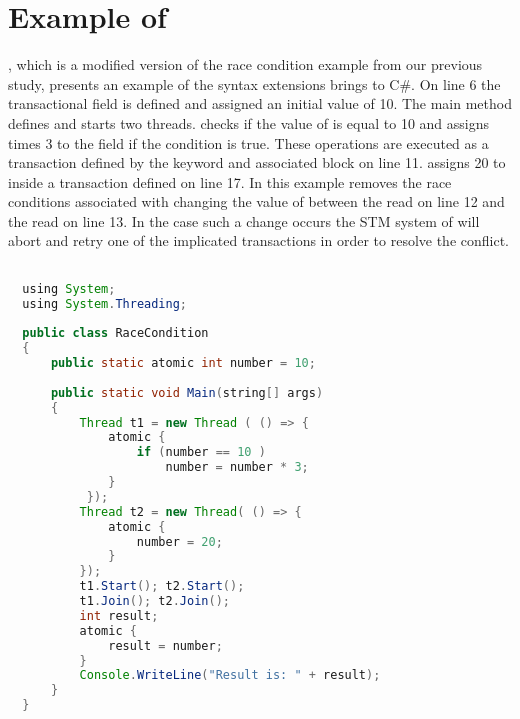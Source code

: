 \section{Example of \stmnamesp}\label{sec:example_design}
, which is a modified version of the race condition example from our previous study\cite[p. 23]{dpt907e14trending}, presents an example of the syntax extensions \stmnamesp brings to C\#. On line 6 the transactional field  is defined and assigned an initial value of 10. The main method defines and starts two threads.  checks if the value of  is equal to 10 and assigns  times 3 to the field if the condition is true. These operations are executed as a transaction defined by the  keyword and associated block on line 11.  assigns 20 to  inside a transaction defined on line 17. In this example \stmnamesp removes the race conditions associated with  changing the value of  between the read on line 12 and the read on line 13. In the case such a change occurs the \ac{STM} system of \stmnamesp will abort and retry one of the implicated transactions in order to resolve the conflict.
 
\begin{lstlisting}[label=lst:stm_atomic_syntax,
  caption={Transaction Syntax},
  language=Java,  
  showspaces=false,
  showtabs=false,
  breaklines=true,
  showstringspaces=false,
  breakatwhitespace=true,
  commentstyle=\color{greencomments},
  keywordstyle=\color{bluekeywords},
  stringstyle=\color{redstrings},
  morekeywords={atomic, retry, orElse, var, get, set, using}]  % Start your code-block

  using System;
  using System.Threading;
  
  public class RaceCondition
  {
      public static atomic int number = 10;
  
      public static void Main(string[] args)
      {
          Thread t1 = new Thread ( () => {
              atomic {
                  if (number == 10 )           
                      number = number * 3;
              }
           });
          Thread t2 = new Thread( () => {
              atomic {
                  number = 20;
              }
          });
          t1.Start(); t2.Start();
          t1.Join(); t2.Join();
          int result;
          atomic {
              result = number;          
          }
          Console.WriteLine("Result is: " + result);
      }
  }
\end{lstlisting}

